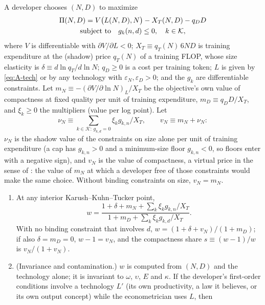 \begin{proposition}\label{prop:A-wedge}
A developer chooses $(N,D)$ to maximize
\begin{equation}\label{eq:A-gw-obj}
\begin{gathered}
\Pi(N,D)=V\big(L(N,D),N\big)-X_T(N,D)-q_DD\\
\textup{subject to}\quad g_k(n,d)\le0,\quad k\in\mathcal K,
\end{gathered}
\end{equation}
where $V$ is differentiable with $\partial V/\partial L<0$; $X_T\equiv q_T(N)\,6ND$ is training expenditure at the
(shadow) price $q_T(N)$ of a training FLOP, whose size elasticity is $\delta\equiv d\ln q_T/d\ln N$; $q_D\ge0$ is a cost
per training token; $L$ is given by \eqref{eq:A-tech} or by any technology with $\varepsilon_N,\varepsilon_D>0$; and the
$g_k$ are differentiable constraints. Let $m_N\equiv-(\partial V/\partial\ln N)_L/X_T$ be the objective's own value of
compactness at fixed quality per unit of training expenditure, $m_D\equiv q_DD/X_T$, and $\xi_k\ge0$ the multipliers
(value per log point). Let
\[
\nu_N\equiv\sum_{k\in\mathcal K:\,g_{k,d}=0}\xi_kg_{k,n}/X_T,\qquad v_N\equiv m_N+\nu_N:
\]
$\nu_N$ is the shadow value of the constraints on size alone per unit of training expenditure (a cap has $g_{k,n}>0$ and a
minimum-size floor $g_{k,n}<0$, so floors enter with a negative sign), and $v_N$ is the value of compactness, a virtual
price in the sense of \citet{neary1980theory}: the value of $m_N$ at which a developer free of those constraints would
make the same choice. Without binding constraints on size, $v_N=m_N$.
\begin{enumerate}
\item[(i)] At any interior Karush--Kuhn--Tucker point,
\begin{equation}\label{eq:A-gw}
w=\frac{1+\delta+m_N+\sum_k\xi_kg_{k,n}/X_T}{1+m_D+\sum_k\xi_kg_{k,d}/X_T}.
\end{equation}
With no binding constraint that involves $d$, $w=(1+\delta+v_N)/(1+m_D)$; if also $\delta=m_D=0$, $w-1=v_N$, and the
compactness share $s\equiv(w-1)/w$ is $v_N/(1+v_N)$.
\item[(ii)] (Invariance and contamination.) $w$ is computed from $(N,D)$ and the technology alone; it is invariant to
$\omega$, $\upsilon$, $E$ and $\kappa$. If the developer's first-order conditions involve a technology $L'$ (its own
productivity, a law it believes, or its own output concept) while the econometrician uses $L$, then

\end{enumerate}
\end{proposition}
